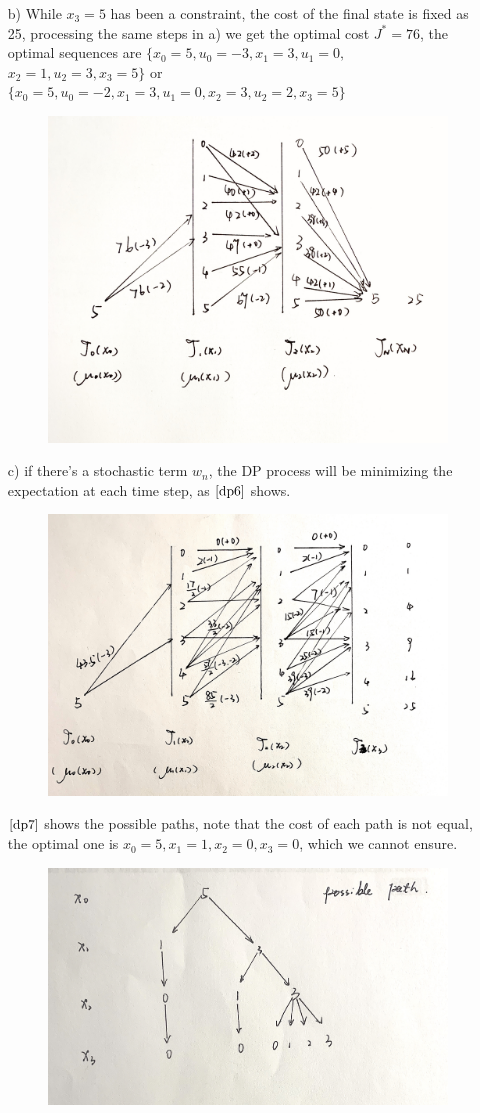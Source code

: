 \documentclass[11pt]{article}
\begin{document}
\begin{itemize}
\item[b)] While $x_3=5$ has been a constraint, the cost of the final state is fixed as 25, processing the same steps in a)
we get the optimal cost $J^{*} = 76$, the optimal sequences are  $\{x_0 = 5, u_0 = -3, x_1 = 3, u_1 = 0,$ $ x_2 = 1, u_2 = 3, x_3 = 5\}$ or 
$\{x_0 = 5, u_0 = -2, x_1 = 3, u_1 = 0, x_2 = 3, u_2 = 2, x_3 = 5\}$
\begin{figure}[htbp]
  \centering
  \includegraphics[width = .58\textwidth]{dp5.jpg}
  \caption{}
  \label{dp5}
\end{figure} 
\item[c)] if there's a stochastic term $w_n$, the DP process will be minimizing the expectation at each time step, as $\ref{dp6}$ shows.
\begin{figure}[htbp]
  \centering
  \includegraphics[width = .8\textwidth]{dp6.jpg}
  \caption{}
  \label{dp6}
\end{figure}  
$\ref{dp7}$ shows the possible paths, note that the cost of each path is not equal, the optimal one is ${x_0 = 5, x_1 = 1, x_2 = 0, x_3 = 0}$, which we cannot ensure.
\begin{figure}[htbp]
  \centering
  \includegraphics[width = .8\textwidth]{dp7.jpg}
  \caption{}
  \label{dp7}
\end{figure} 


\end{itemize}
\end{document}
